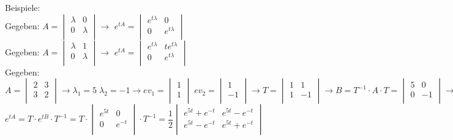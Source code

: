 Beispiele:\\
Gegeben: $A = 	\begin{vmatrix} 
	        		\lambda & 0\\ 
	        		0 & \lambda\\   
				\end{vmatrix} 
				\rightarrow$ 
$e^{tA} = \begin{vmatrix} 
	        		e^{t\lambda} & 0\\ 
	        		0 & e^{t\lambda}\\   
				\end{vmatrix}$\\
Gegeben: $A = 	\begin{vmatrix} 
	        		\lambda & 1\\ 
	        		0 & \lambda\\   
				\end{vmatrix} 
				\rightarrow$ 
$e^{tA} = \begin{vmatrix} 
	        		e^{t\lambda} & te^{t\lambda}\\ 
	        		0 & e^{t\lambda}\\   
				\end{vmatrix}$\\
				
Gegeben: $A = 	\begin{vmatrix} 
	        		2 & 3\\ 
	        		3 & 2\\   
				\end{vmatrix} \rightarrow
				\lambda_1=5 \; \lambda_2=-1 \rightarrow ev_1=\begin{vmatrix}
					1\\ 
					1\\   
				\end{vmatrix} \;
				ev_2=\begin{vmatrix}
					1\\ 
					-1\\   
				\end{vmatrix} \rightarrow
				T=\begin{vmatrix} 
	        		1 & 1\\ 
	        		1 & -1\\   
				\end{vmatrix} \rightarrow 
				B=T^{-1} \cdot A \cdot T=\begin{vmatrix} 
	        		5 & 0\\ 
	        		0 & -1\\   
				\end{vmatrix} \rightarrow$\\
				\hspace*{4cm}$e^{tA}=T \cdot e^{tB} \cdot T^{-1}=
				T \cdot \begin{vmatrix} 
					e^{5 t} & 0\\ 
					0 & e^{-t}\\   
				\end{vmatrix} \cdot T^{-1} =
				\dfrac{1}{2}\begin{vmatrix} 
					e^{5 t} + e^{-t}& e^{5 t} - e^{-t}\\ 
					e^{5 t} - e^{-t} & e^{5 t} + e^{-t}\\   
				\end{vmatrix}$

